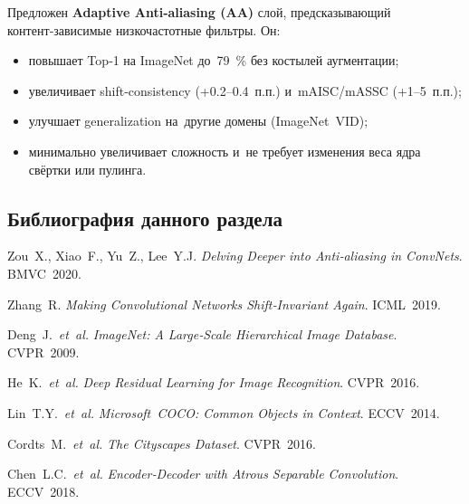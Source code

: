 Предложен \textbf{Adaptive Anti‑aliasing (AA)} слой, предсказывающий контент‑зависимые
низкочастотные фильтры. Он:
\begin{itemize}
  \item повышает Top‑1 на ImageNet до \SI{79}{\percent} без костылей аугментации;
  \item увеличивает shift‑consistency (+0.2–0.4 п.п.) и mAISC/mASSC (+1–5 п.п.);
  \item улучшает generalization на другие домены (ImageNet VID);
  \item минимально увеличивает сложность и не требует изменения веса ядра
  свёртки или пулинга.
\end{itemize}

\subsection*{Библиография данного раздела}
\begin{enumerate*}[label=\arabic*.]
  \item Zou X., Xiao F., Yu Z., Lee Y.J. \textit{Delving Deeper into Anti‑aliasing in ConvNets}. BMVC 2020.
  \item Zhang R. \textit{Making Convolutional Networks Shift‑Invariant Again}. ICML 2019.
  \item Deng J. \textit{et al.} \textit{ImageNet: A Large‑Scale Hierarchical Image Database}. CVPR 2009.
  \item He K. \textit{et al.} \textit{Deep Residual Learning for Image Recognition}. CVPR 2016.
  \item Lin T.Y. \textit{et al.} \textit{Microsoft COCO: Common Objects in Context}. ECCV 2014.
  \item Cordts M. \textit{et al.} \textit{The Cityscapes Dataset}. CVPR 2016.
  \item Chen L.C. \textit{et al.} \textit{Encoder‑Decoder with Atrous Separable Convolution}. ECCV 2018.
\end{enumerate*}

